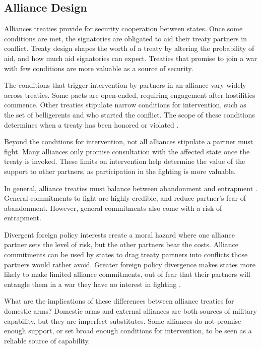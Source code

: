 \documentclass[12pt]{article}
\begin{document}
\subsection*{Alliance Design}

Alliances treaties provide for security cooperation between states. Once some conditions are met, the signatories are obligated to aid their treaty partners in conflict. Treaty design shapes the worth of a treaty by altering the probability of aid, and how much aid signatories can expect. Treaties that promise to join a war with few conditions are more valuable as a source of security. 

The conditions that trigger intervention by partners in an alliance vary widely across treaties. Some pacts are open-ended, requiring engagement after hostilities commence. Other treaties stipulate narrow conditions for intervention, such as the set of belligerents and who started the conflict. The scope of these conditions determines when a treaty has been honored or violated \citep{Leedsetal2000}. 

Beyond the conditions for intervention, not all alliances stipulate a partner must fight. Many alliances only promise consultation with the affected state once the treaty is invoked. These limits on intervention help determine the value of the support to other partners, as participation in the fighting is more valuable. 

In general, alliance treaties must balance between abandonment and entrapment \citep{Snyder1984, Benson2012}. General commitments to fight are highly credible, and reduce partner's fear of abandonment. However, general commitments also come with a risk of entrapment. 

Divergent foreign policy interests create a moral hazard where one alliance partner sets the level of risk, but the other partners bear the costs. Alliance commitments can be used by states to drag treaty partners into conflicts those partners would rather avoid. Greater foreign policy divergence makes states more likely to make limited alliance commitments, out of fear that their partners will entangle them in a war they have no interest in fighting \citep{Benson2012}. 

What are the implications of these differences between alliance treaties for domestic arms? Domestic arms and external alliances are both sources of military capability, but they are imperfect substitutes. Some alliances do not promise enough support, or set broad enough conditions for intervention, to be seen as a reliable source of capability. 
\end{document}
